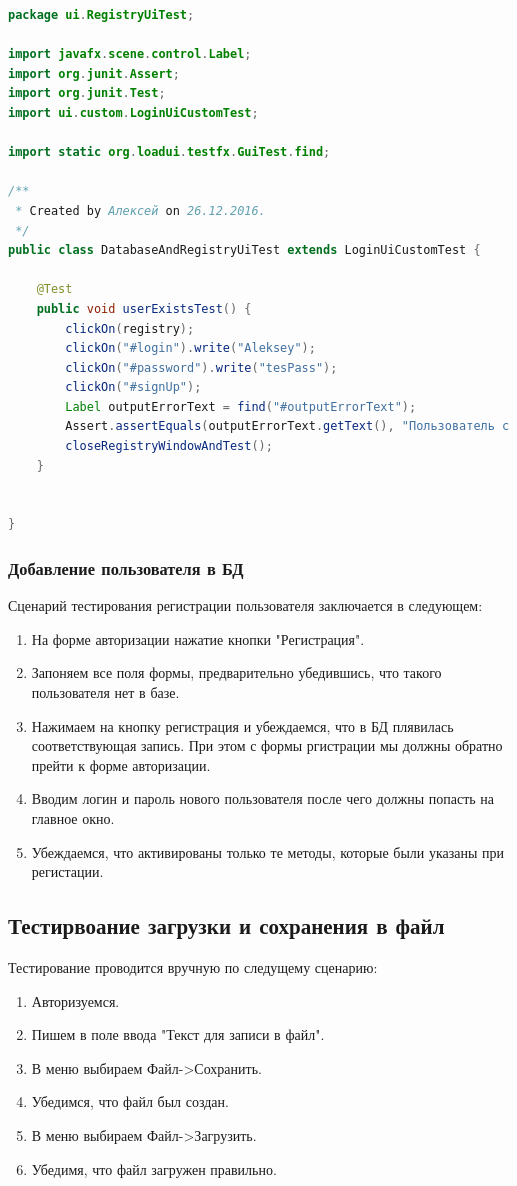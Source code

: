 \documentclass[a4paper,12pt]{article}
\begin{document}
\begin{lstlisting}[language=java, caption=код модуля DatabaseAndRegistryUiTest.java, label=lstlisting_database:test_ui]
package ui.RegistryUiTest;

import javafx.scene.control.Label;
import org.junit.Assert;
import org.junit.Test;
import ui.custom.LoginUiCustomTest;

import static org.loadui.testfx.GuiTest.find;

/**
 * Created by Алексей on 26.12.2016.
 */
public class DatabaseAndRegistryUiTest extends LoginUiCustomTest {

    @Test
    public void userExistsTest() {
        clickOn(registry);
        clickOn("#login").write("Aleksey");
        clickOn("#password").write("tesPass");
        clickOn("#signUp");
        Label outputErrorText = find("#outputErrorText");
        Assert.assertEquals(outputErrorText.getText(), "Пользователь с логином: Aleksey существует!");
        closeRegistryWindowAndTest();
    }


}
\end{lstlisting}

\subsubsection{Добавление пользователя в БД}
\par Сценарий тестирования регистрации пользователя заключается в следующем:
\begin{enumerate}
\item На форме авторизации нажатие кнопки "Регистрация".
\item Запоняем все поля формы, предварительно убедившись, что такого пользователя нет в базе.
\item Нажимаем на кнопку регистрация и убеждаемся, что в БД плявилась соответствующая запись. При этом с формы ргистрации мы должны обратно прейти к форме авторизации.
\item Вводим логин и пароль нового пользователя после чего должны попасть на главное окно.
\item Убеждаемся, что активированы только те методы, которые были указаны при регистации.
\end{enumerate}

\newpage \subsection{Тестирвоание загрузки и сохранения в файл}
Тестирование проводится вручную  по следущему сценарию:
\begin{enumerate}
\item Авторизуемся.
\item Пишем в поле ввода "Текст для записи в файл".
\item В меню выбираем Файл->Сохранить.
\item Убедимся, что файл был создан.
\item В меню выбираем Файл->Загрузить.
\item Убедимя, что файл загружен правильно.
\end{enumerate}
\end{document}
